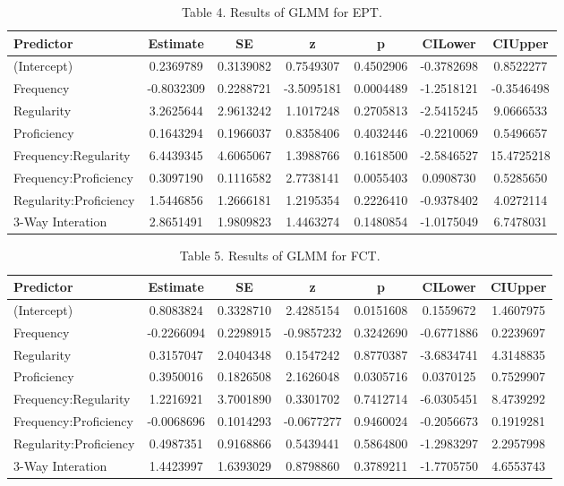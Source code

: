 \documentclass[
  english,
  man,floatsintext]{apa6}
\begin{document}
\begin{table}

\caption{\label{tab:create-EPT-table}Table 4. Results of GLMM for EPT.}
\centering
\begin{tabular}[t]{l|c|c|c|c|c|c}
\hline
Predictor & Estimate & SE & z & p & CILower & CIUpper\\
\hline
(Intercept) & 0.2369789 & 0.3139082 & 0.7549307 & 0.4502906 & -0.3782698 & 0.8522277\\
\hline
Frequency & -0.8032309 & 0.2288721 & -3.5095181 & 0.0004489 & -1.2518121 & -0.3546498\\
\hline
Regularity & 3.2625644 & 2.9613242 & 1.1017248 & 0.2705813 & -2.5415245 & 9.0666533\\
\hline
Proficiency & 0.1643294 & 0.1966037 & 0.8358406 & 0.4032446 & -0.2210069 & 0.5496657\\
\hline
Frequency:Regularity & 6.4439345 & 4.6065067 & 1.3988766 & 0.1618500 & -2.5846527 & 15.4725218\\
\hline
Frequency:Proficiency & 0.3097190 & 0.1116582 & 2.7738141 & 0.0055403 & 0.0908730 & 0.5285650\\
\hline
Regularity:Proficiency & 1.5446856 & 1.2666181 & 1.2195354 & 0.2226410 & -0.9378402 & 4.0272114\\
\hline
3-Way Interation & 2.8651491 & 1.9809823 & 1.4463274 & 0.1480854 & -1.0175049 & 6.7478031\\
\hline
\end{tabular}
\end{table}

\begin{table}

\caption{\label{tab:create-FCT-table}Table 5. Results of GLMM for FCT.}
\centering
\begin{tabular}[t]{l|c|c|c|c|c|c}
\hline
Predictor & Estimate & SE & z & p & CILower & CIUpper\\
\hline
(Intercept) & 0.8083824 & 0.3328710 & 2.4285154 & 0.0151608 & 0.1559672 & 1.4607975\\
\hline
Frequency & -0.2266094 & 0.2298915 & -0.9857232 & 0.3242690 & -0.6771886 & 0.2239697\\
\hline
Regularity & 0.3157047 & 2.0404348 & 0.1547242 & 0.8770387 & -3.6834741 & 4.3148835\\
\hline
Proficiency & 0.3950016 & 0.1826508 & 2.1626048 & 0.0305716 & 0.0370125 & 0.7529907\\
\hline
Frequency:Regularity & 1.2216921 & 3.7001890 & 0.3301702 & 0.7412714 & -6.0305451 & 8.4739292\\
\hline
Frequency:Proficiency & -0.0068696 & 0.1014293 & -0.0677277 & 0.9460024 & -0.2056673 & 0.1919281\\
\hline
Regularity:Proficiency & 0.4987351 & 0.9168866 & 0.5439441 & 0.5864800 & -1.2983297 & 2.2957998\\
\hline
3-Way Interation & 1.4423997 & 1.6393029 & 0.8798860 & 0.3789211 & -1.7705750 & 4.6553743\\
\hline
\end{tabular}
\end{table}
\end{document}
